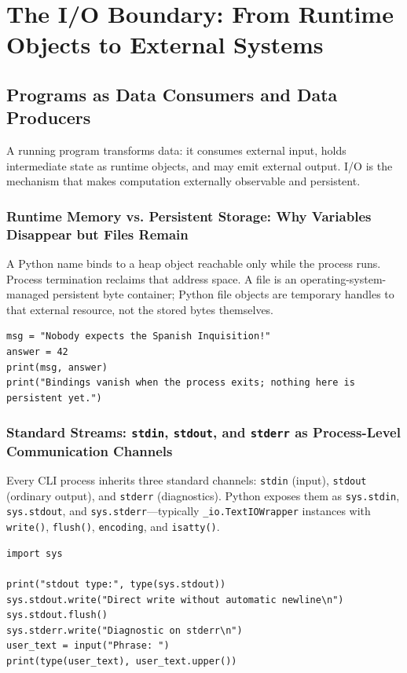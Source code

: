 \documentclass[a4paper,twoside]{report}
\begin{document}
\section{The I/O Boundary: From Runtime Objects to External Systems}

\subsection{Programs as Data Consumers and Data Producers}

A running program transforms data: it consumes external input, holds intermediate state as runtime objects, and may emit external output. I/O is the mechanism that makes computation externally observable and persistent.

\subsubsection{Runtime Memory vs. Persistent Storage: Why Variables Disappear but Files Remain}

A Python name binds to a heap object reachable only while the process runs. Process termination reclaims that address space. A file is an operating-system-managed persistent byte container; Python file objects are temporary handles to that external resource, not the stored bytes themselves.

\begin{verbatim}
msg = "Nobody expects the Spanish Inquisition!"
answer = 42
print(msg, answer)
print("Bindings vanish when the process exits; nothing here is persistent yet.")
\end{verbatim}

\subsubsection{Standard Streams: \texttt{stdin}, \texttt{stdout}, and \texttt{stderr} as Process-Level Communication Channels}

Every CLI process inherits three standard channels: \texttt{stdin} (input), \texttt{stdout} (ordinary output), and \texttt{stderr} (diagnostics). Python exposes them as \texttt{sys.stdin}, \texttt{sys.stdout}, and \texttt{sys.stderr}---typically \texttt{\_io.TextIOWrapper} instances with \texttt{write()}, \texttt{flush()}, \texttt{encoding}, and \texttt{isatty()}.

\begin{verbatim}
import sys

print("stdout type:", type(sys.stdout))
sys.stdout.write("Direct write without automatic newline\n")
sys.stdout.flush()
sys.stderr.write("Diagnostic on stderr\n")
user_text = input("Phrase: ")
print(type(user_text), user_text.upper())
\end{verbatim}
\end{document}
